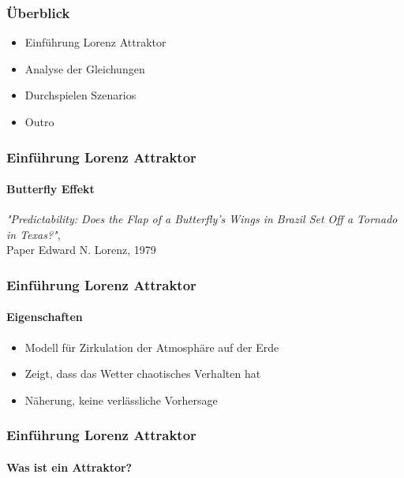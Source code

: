 \documentclass[presentation.tex]{subfiles}
\begin{document}
	\frame{\titlepage}
    
    \begin{frame}
        \frametitle{Überblick}
        \begin{itemize}
            \item Einführung Lorenz Attraktor
            \item Analyse der Gleichungen
            \item Durchspielen Szenarios
            \item Outro
        \end{itemize}
    \end{frame}
    
    \begin{frame}
    	\frametitle{Einführung Lorenz Attraktor}
    	\framesubtitle{Butterfly Effekt}
		\textit{"Predictability: Does the Flap of a Butterfly's Wings in Brazil Set Off a Tornado in Texas?"}, \\
		Paper Edward N. Lorenz, 1979
    \end{frame}
    
    \begin{frame}
    	\frametitle{Einführung Lorenz Attraktor}
    	\framesubtitle{Eigenschaften}
    	\begin{itemize}
    		\item Modell für Zirkulation der Atmosphäre auf der Erde
    		\item Zeigt, dass das Wetter chaotisches Verhalten hat
    		\item Näherung, keine verlässliche Vorhersage
    	\end{itemize}
    \end{frame}
    
    \begin{frame}
		\frametitle{Einführung Lorenz Attraktor}
		\framesubtitle{Was ist ein Attraktor?}
		
    \end{frame}
    
\end{document}
